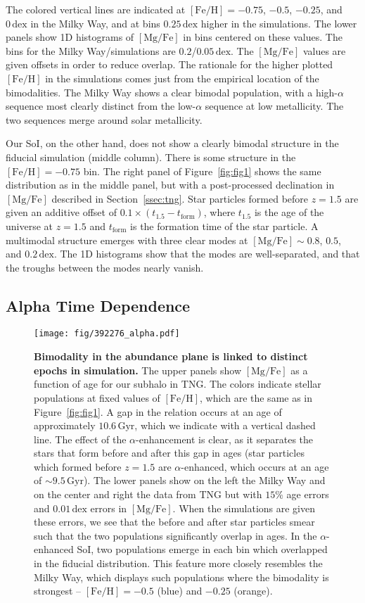 \documentclass[linenumbers, twocolumn]{aastex631}
\newcommand{\Gyr}{\ensuremath{\textrm{Gyr}}}
\newcommand{\FeH}{\ensuremath{[\textrm{Fe}/\textrm{H}]}}
\newcommand{\MgFe}{\ensuremath{[\textrm{Mg}/\textrm{Fe}]}}
\newcommand{\dex}{\ensuremath{\textrm{dex}}}
\begin{document}
The colored vertical lines are indicated at $\FeH=-0.75$, $-0.5$, $-0.25$, and $0\,\dex$ in the Milky Way, and at bins $0.25\,\dex$ higher in the simulations. The lower panels show 1D histograms of \MgFe{} in bins centered on these values. The bins for the Milky Way/simulations are $0.2$/$0.05\,\dex$. The \MgFe{} values are given offsets in order to reduce overlap. The rationale for the higher plotted \FeH{} in the simulations comes just from the empirical location of the bimodalities. The Milky Way shows a clear bimodal population, with a high-$\alpha$ sequence most clearly distinct from the low-$\alpha$ sequence at low metallicity. The two sequences merge around solar metallicity.

Our SoI, on the other hand, does not show a clearly bimodal structure in the fiducial simulation (middle column). There is some structure in the $\FeH=-0.75$ bin. The right panel of Figure~\ref{fig:fig1} shows the same distribution as in the middle panel, but with a post-processed declination in \MgFe{} described in Section~\ref{ssec:tng}. Star particles formed before $z=1.5$ are given an additive offset of $0.1\times\left(t_{1.5}-t_{\textrm{form}}\right)$, where $t_{1.5}$ is the age of the universe at $z=1.5$ and $t_{\textrm{form}}$ is the formation time of the star particle. A multimodal structure emerges with three clear modes at $\MgFe\sim0.8$, $0.5$, and $0.2\,\dex$. The 1D histograms show that the modes are well-separated, and that the troughs between the modes nearly vanish.

\subsection{Alpha Time Dependence}\label{ssec:alpha_time}

\begin{figure*}
  \centering
  \texttt{[image: fig/392276\_alpha.pdf]}
  \caption{\textbf{Bimodality in the abundance plane is linked to distinct epochs in simulation.} The upper panels show \MgFe{} as a function of age for our subhalo in TNG. The colors indicate stellar populations at fixed values of \FeH{}, which are the same as in Figure~\ref{fig:fig1}. A gap in the relation occurs at an age of approximately $10.6\,\Gyr$, which we indicate with a vertical dashed line. The effect of the $\alpha$-enhancement is clear, as it separates the stars that form before and after this gap in ages (star particles which formed before $z=1.5$ are $\alpha$-enhanced, which occurs at an age of $\sim9.5\,\Gyr$). The lower panels show on the left the Milky Way and on the center and right the data from TNG but with $15\%$ age errors and $0.01\,\dex$ errors in \MgFe{}. When the simulations are given these errors, we see that the before and after star particles smear such that the two populations significantly overlap in ages. In the $\alpha$-enhanced SoI, two populations emerge in each bin which overlapped in the fiducial distribution. This feature more closely resembles the Milky Way, which displays such populations where the bimodality is strongest -- $\FeH=-0.5$ (blue) and $-0.25$ (orange).}
  \label{fig:alpha}
\end{figure*}
\end{document}
